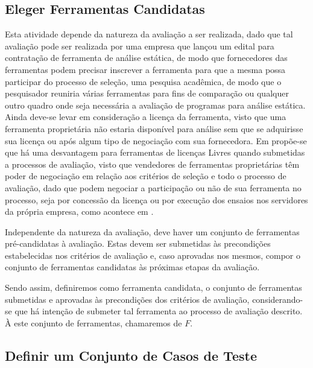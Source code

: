 \subsection{Eleger Ferramentas Candidatas}

Esta atividade depende da natureza da avaliação a ser realizada, dado que tal avaliação pode ser realizada por uma empresa que lançou um edital para contratação de ferramenta de análise estática, de modo que fornecedores das ferramentas podem precisar inscrever a ferramenta para que a mesma possa participar do processo de seleção, uma pesquisa acadêmica, de modo que o pesquisador reuniria várias ferramentas para fins de comparação ou qualquer outro quadro onde seja necessária a avaliação de programas para análise estática. Ainda deve-se levar em consideração a licença da ferramenta, visto que uma ferramenta proprietária não estaria disponível para análise sem que se adquirisse sua licença ou após algum tipo de negociação com sua fornecedora. Em \cite{pascal} propõe-se que há uma desvantagem para ferramentas de licenças Livres quando submetidas a processos de avaliação, visto que vendedores de ferramentas proprietárias têm poder de negociação em relação aos critérios de seleção e todo o processo de avaliação, dado que podem negociar a participação ou não de sua ferramenta no processo, seja por concessão da licença ou por execução dos ensaios nos servidores da própria empresa, como acontece em \cite{sate_iv}.

Independente da natureza da avaliação, deve haver um conjunto de ferramentas pré-candidatas à avaliação. Estas devem ser submetidas às precondições estabelecidas nos critérios de avaliação e, caso aprovadas nos mesmos, compor o conjunto de ferramentas candidatas às próximas etapas da avaliação.

Sendo assim, definiremos como ferramenta candidata, o conjunto de ferramentas submetidas e aprovadas às precondições dos critérios de avaliação, considerando-se que há intenção de submeter tal ferramenta ao processo de avaliação descrito. À este conjunto de ferramentas, chamaremos de $F$.

\subsection{Definir um Conjunto de Casos de Teste}

